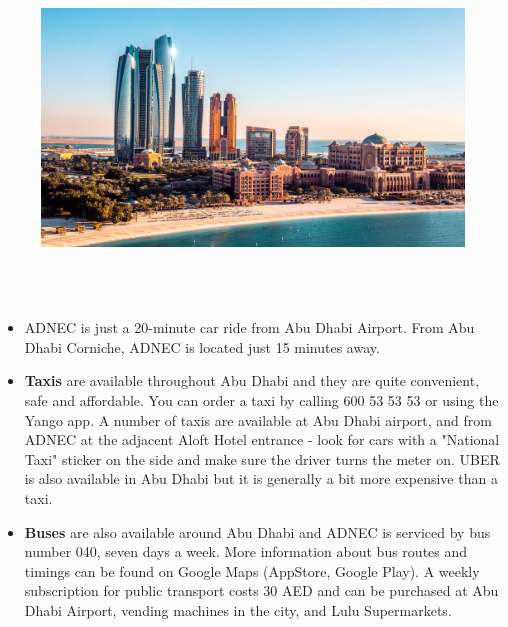  \begin{figure}[h!]
  \centering
      \includegraphics[width=0.9\linewidth]{examples/handbook_coling25/local_guide/images/abu-dhabi.png}
 \end{figure}
 \leavevmode\newline

 \\

 \\

\begin{itemize}[noitemsep]
    \item ADNEC is just a 20-minute car ride from Abu Dhabi Airport. From Abu Dhabi Corniche, ADNEC is located just 15 minutes away.
    \item \textbf{Taxis} are available throughout Abu Dhabi and they are quite convenient, safe and affordable. You can order a taxi by calling  600 53 53 53 or using the Yango app. A number of taxis are available at Abu Dhabi airport, and from ADNEC at the adjacent Aloft Hotel entrance - look for cars with a "National Taxi" sticker on the side and make sure the driver turns the meter on. UBER is also available in Abu Dhabi but it is generally a bit more expensive than a taxi.
    \item \textbf{Buses} are also available around Abu Dhabi and ADNEC is serviced by bus number 040, seven days a week. More information about bus routes and timings can be found on Google Maps (AppStore, Google Play). A weekly subscription for public transport costs 30 AED and can be purchased at Abu Dhabi Airport, vending machines in the city, and Lulu Supermarkets.
\end{itemize}

